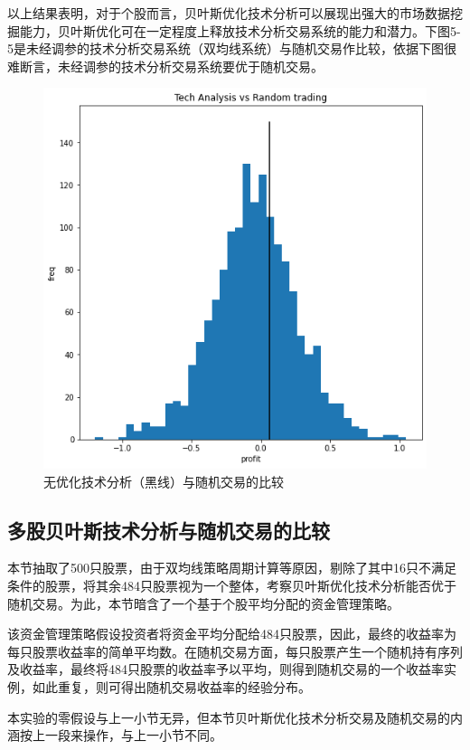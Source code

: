 \documentclass[twoside,longtitle]{LZUthesis}
\begin{document}
以上结果表明，对于个股而言，贝叶斯优化技术分析可以展现出强大的市场数据挖掘能力，贝叶斯优化可在一定程度上释放技术分析交易系统的能力和潜力。下图5-5是未经调参的技术分析交易系统（双均线系统）与随机交易作比较，依据下图很难断言，未经调参的技术分析交易系统要优于随机交易。


\begin{figure}[h]
    \centering
    \includegraphics[scale=0.7]{fig5-5.png}
    \caption{无优化技术分析（黑线）与随机交易的比较}
    \label{fig:my_label}
\end{figure}


\subsection{多股贝叶斯技术分析与随机交易的比较}
本节抽取了500只股票，由于双均线策略周期计算等原因，剔除了其中16只不满足条件的股票，将其余484只股票视为一个整体，考察贝叶斯优化技术分析能否优于随机交易。为此，本节暗含了一个基于个股平均分配的资金管理策略。

该资金管理策略假设投资者将资金平均分配给484只股票，因此，最终的收益率为每只股票收益率的简单平均数。在随机交易方面，每只股票产生一个随机持有序列及收益率，最终将484只股票的收益率予以平均，则得到随机交易的一个收益率实例，如此重复，则可得出随机交易收益率的经验分布。

本实验的零假设与上一小节无异，但本节贝叶斯优化技术分析交易及随机交易的内涵按上一段来操作，与上一小节不同。
\end{document}
